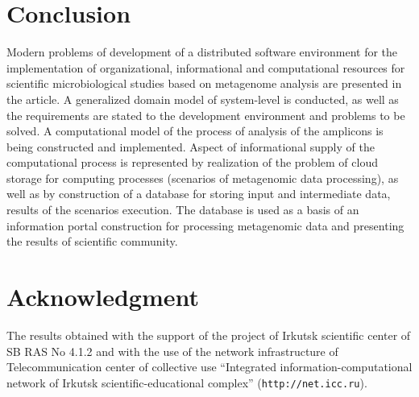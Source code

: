 \documentclass[conference,a4paper]{IEEEtran}
\providecommand\url[1]{\texttt{#1}}
\begin{document}




\section{Conclusion}
Modern problems of development of a distributed software environment for the implementation of organizational, informational and computational resources for scientific microbiological studies based on metagenome analysis are presented in the article. A generalized domain model of system-level is conducted, as well as the requirements are stated to the development environment and problems to be solved. A computational model of the process of analysis of the amplicons is being constructed and implemented. Aspect of informational supply of the computational process is represented by realization of the problem of cloud storage for computing processes (scenarios of metagenomic data processing), as well as by construction of a database for storing input and intermediate data, results of the scenarios execution. The database is used as a basis of an information portal construction for processing metagenomic data and presenting the results of scientific community.





\section*{Acknowledgment}

The results obtained with the support of the project of Irkutsk scientific center of SB RAS No 4.1.2 and with the use of the network infrastructure of Telecommunication center of collective use ``Integrated information-computational network of Irkutsk scientific-educational complex'' (\url{http://net.icc.ru}).

\end{document}

